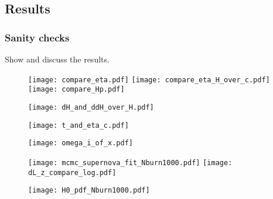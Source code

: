 

\subsection{Results}\label{M1:results}
\subsubsection{Sanity checks}
Show and discuss the results.


\begin{figure}
    \texttt{[image: compare\_eta.pdf]}
    \texttt{[image: compare\_eta\_H\_over\_c.pdf]}
    \texttt{[image: compare\_Hp.pdf]}
\end{figure}

\begin{figure}[ht!]
    \texttt{[image: dH\_and\_ddH\_over\_H.pdf]}
\end{figure}

\begin{figure}[ht!]
    \texttt{[image: t\_and\_eta\_c.pdf]} 
\end{figure}


\begin{figure}[ht!]
    \texttt{[image: omega\_i\_of\_x.pdf]}
\end{figure}

\begin{figure}[ht!]
    \texttt{[image: mcmc\_supernova\_fit\_Nburn1000.pdf]}
    \texttt{[image: dL\_z\_compare\_log.pdf]}
\end{figure}

\begin{figure}[ht!]
    \texttt{[image: H0\_pdf\_Nburn1000.pdf]}    
\end{figure}